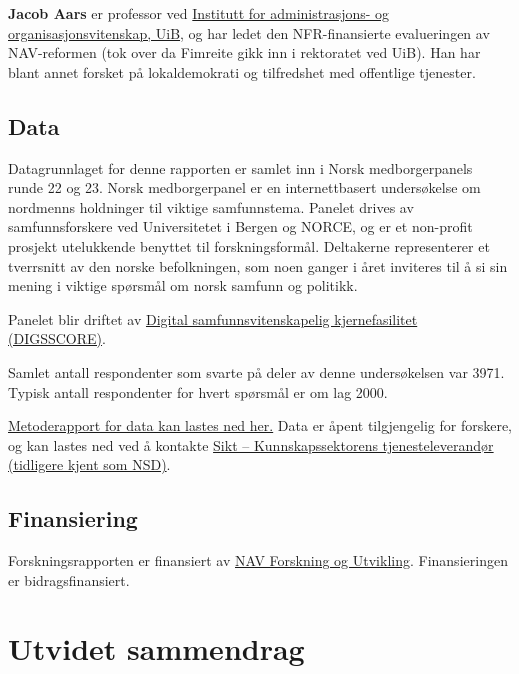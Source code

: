 \documentclass[
]{book}
\begin{document}
\textbf{Jacob Aars} er professor ved \href{https://www.uib.no/personer/Jacob.Aars}{Institutt for administrasjons- og organisasjonsvitenskap, UiB}, og har ledet den NFR-finansierte evalueringen av NAV-reformen (tok over da Fimreite gikk inn i rektoratet ved UiB).
Han har blant annet forsket på lokaldemokrati og tilfredshet med offentlige tjenester.

\hypertarget{data}{%
\section{Data}\label{data}}

Datagrunnlaget for denne rapporten er samlet inn i Norsk medborgerpanels runde 22 og 23.
Norsk medborgerpanel er en internettbasert undersøkelse om nordmenns holdninger til viktige samfunnstema.
Panelet drives av samfunnsforskere ved Universitetet i Bergen og NORCE, og er et non-profit prosjekt utelukkende benyttet til forskningsformål.
Deltakerne representerer et tverrsnitt av den norske befolkningen, som noen ganger i året inviteres til å si sin mening i viktige spørsmål om norsk samfunn og politikk.

Panelet blir driftet av \href{www.digsscore.uib.no}{Digital samfunnsvitenskapelig kjernefasilitet (DIGSSCORE)}.

Samlet antall respondenter som svarte på deler av denne undersøkelsen var 3971.
Typisk antall respondenter for hvert spørsmål er om lag 2000.

\href{https://www.uib.no/en/digsscore/122162/methodology-and-field-periods}{Metoderapport for data kan lastes ned her.}
Data er åpent tilgjengelig for forskere, og kan lastes ned ved å kontakte \href{https://sikt.no/}{Sikt -- Kunnskapssektorens tjenesteleverandør (tidligere kjent som NSD)}.

\hypertarget{finansiering}{%
\section{Finansiering}\label{finansiering}}

Forskningsrapporten er finansiert av \href{https://www.nav.no/no/nav-og-samfunn/kunnskap/fou-midler/pagaende-fou-prosjekter2/navs-tiltak-og-virkemidler}{NAV Forskning og Utvikling}.
Finansieringen er bidragsfinansiert.

\hypertarget{sammendrag}{%
\chapter{Utvidet sammendrag}\label{sammendrag}}
\end{document}
